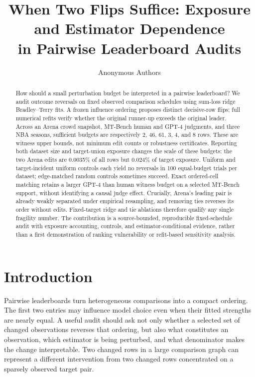 \documentclass{article}
\title{When Two Flips Suffice: Exposure and Estimator Dependence\\in Pairwise Leaderboard Audits}
\author{Anonymous Authors}
\begin{document}
\maketitle

\begin{abstract}
How should a small perturbation budget be interpreted in a pairwise leaderboard? We audit outcome reversals on fixed observed comparison schedules using sum-loss ridge Bradley--Terry fits. A frozen influence ordering proposes distinct decisive-row flips; full numerical refits verify whether the original runner-up exceeds the original leader. Across an Arena crowd snapshot, MT-Bench human and GPT-4 judgments, and three NBA seasons, sufficient budgets are respectively 2, 46, 61, 3, 4, and 8 rows. These are witness upper bounds, not minimum edit counts or robustness certificates. Reporting both dataset size and target-union exposure changes the scale of these budgets: the two Arena edits are 0.0035\% of all rows but 0.024\% of target exposure. Uniform and target-incident uniform controls each yield no reversals in 100 equal-budget trials per dataset; edge-matched random controls sometimes succeed. Exact ordered-cell matching retains a larger GPT-4 than human witness budget on a selected MT-Bench support, without identifying a causal judge effect. Crucially, Arena's leading pair is already weakly separated under empirical resampling, and removing ties reverses its order without edits. Fixed-target ridge and tie ablations therefore qualify any single fragility number. The contribution is a source-bounded, reproducible fixed-schedule audit with exposure accounting, controls, and estimator-conditional evidence, rather than a first demonstration of ranking vulnerability or refit-based sensitivity analysis.
\end{abstract}

\section{Introduction}
\label{sec:introduction}
Pairwise leaderboards turn heterogeneous comparisons into a compact ordering. The first two entries may influence model choice even when their fitted strengths are nearly equal. A useful audit should ask not only whether a selected set of changed observations reverses that ordering, but also what constitutes an observation, which estimator is being perturbed, and what denominator makes the change interpretable. Two changed rows in a large comparison graph can represent a different intervention from two changed rows concentrated on a sparsely observed target pair.
\end{document}
